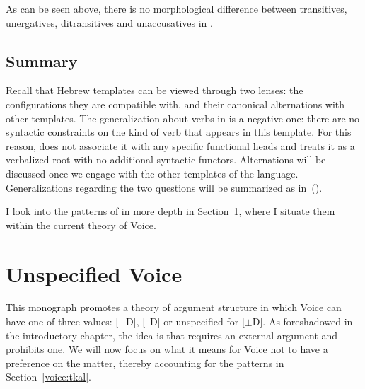 
As can be seen above, there is no morphological difference between transitives, unergatives, ditransitives and unaccusatives in {\tkal}.

	\subsection{Summary}

Recall that Hebrew templates can be viewed through two lenses: the configurations they are compatible with, and their canonical alternations with other templates. The generalization about verbs in {\tkal} is a negative one: there are no syntactic constraints on the kind of verb that appears in this template. For this reason, \cite{doron03} does not associate it with any specific functional heads and \cite{borer13oup,borer15roots} treats it as a verbalized root with no additional syntactic functors. Alternations will be discussed once we engage with the other templates of the language. Generalizations regarding the two questions will be summarized as in~(\nextx).


I look into the patterns of {\tkal} in more depth in Section~\ref{voice:voice}, where I situate them within the current theory of Voice.

\section{Unspecified Voice} \label{voice:voice}
This monograph promotes a theory of argument structure in which Voice can have one of three values: [\!+\!D], [--D] or unspecified for [$\pm$D]. As foreshadowed in the introductory chapter, the idea is that {\vd} requires an external argument and {\vz} prohibits one. We will now focus on what it means for Voice not to have a preference on the matter, thereby accounting for the patterns in Section~\ref{voice:tkal}.

